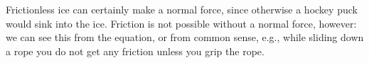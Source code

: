 Frictionless ice can certainly make a normal force, since otherwise
 a hockey puck would sink into the ice. Friction is
not possible without a normal force, however: we can see this
 from the equation, or from common sense, e.g., while
sliding down a rope you do not get any friction unless you grip the rope.



